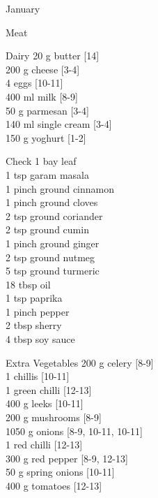 \begin{menu}{January}
\begin{shoppinglist}{Meat}
      \end{shoppinglist}%
      \begin{shoppinglist}{Dairy}
      20 g butter {\scriptsize[14]}\\
      200 g cheese {\scriptsize[3-4]}\\
      4  eggs {\scriptsize[10-11]}\\
      400 ml milk {\scriptsize[8-9]}\\
      50 g parmesan {\scriptsize[3-4]}\\
      140 ml single cream {\scriptsize[3-4]}\\
      150 g yoghurt {\scriptsize[1-2]}\\
      \end{shoppinglist}%
      \par\vfil %
      \vfil\clearpage %
      \begin{shoppinglist}{Check}
      1  bay leaf \\
      1 tsp garam masala \\
      1 pinch ground cinnamon \\
      1 pinch ground cloves \\
      2 tsp ground coriander \\
      2 tsp ground cumin \\
      1 pinch ground ginger \\
      2 tsp ground nutmeg \\
      5 tsp ground turmeric \\
      18 tbsp oil \\
      1 tsp paprika \\
      1 pinch pepper \\
      2 tbsp sherry \\
      4 tbsp soy sauce \\
      \end{shoppinglist}%
      \begin{shoppinglist}{Extra Vegetables}
      200 g celery {\scriptsize[8-9]}\\
      1  chillis {\scriptsize[10-11]}\\
      1  green chilli {\scriptsize[12-13]}\\
      400 g leeks {\scriptsize[10-11]}\\
      200 g mushrooms {\scriptsize[8-9]}\\
      1050 g onions {\scriptsize[8-9, 10-11, 10-11]}\\
      1  red chilli {\scriptsize[12-13]}\\
      300 g red pepper {\scriptsize[8-9, 12-13]}\\
      50 g spring onions {\scriptsize[10-11]}\\
      400 g tomatoes {\scriptsize[12-13]}\\
      \end{shoppinglist}%
      \par\vfil %
    \vfil\clearpage
  

\end{menu}
